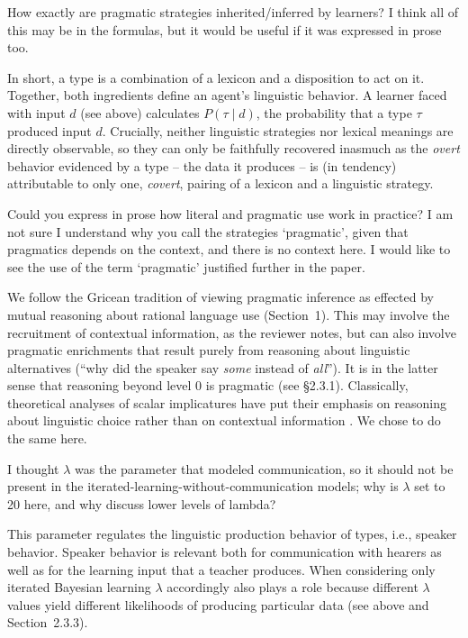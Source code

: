\documentclass[12pt,a4paper]{article}
\begin{document}
\vspace{.5cm}
\begin{mdframed}[backgroundcolor=gray!25,linecolor=gray!25]
How exactly are pragmatic strategies inherited/inferred by learners?    I think all of this may be in the formulas, but it would be useful if it was expressed in prose too.
\end{mdframed}
In short, a type is a combination of a lexicon and a disposition to act on it. Together, both ingredients define an agent's linguistic behavior. A learner faced with input $d$ (see above) calculates $P(\tau \mid d)$, the probability that a type $\tau$ produced input $d$. Crucially, neither linguistic strategies nor lexical meanings are directly observable, so they can only be faithfully recovered inasmuch as the {\em overt} behavior evidenced by a type -- the data it produces -- is (in tendency) attributable to only one, {\em covert}, pairing of a lexicon and a linguistic strategy.

\vspace{.5cm}
\begin{mdframed}[backgroundcolor=gray!25,linecolor=gray!25]
Could you express in prose how literal and pragmatic use work in practice? I am not sure I understand why you call the strategies `pragmatic', given that pragmatics depends on the context, and there is no context here. I would like to see the use of the term `pragmatic' justified further in the paper.
\end{mdframed}
We follow the Gricean tradition of viewing pragmatic inference as effected by mutual reasoning about rational language use (Section~1). This may involve the recruitment of contextual information, as the reviewer notes, but can also involve pragmatic enrichments that result purely from reasoning about linguistic alternatives (``why did the speaker say {\em some} instead of {\em all}''). It is in the latter sense that reasoning beyond level $0$ is pragmatic (see \S2.3.1). Classically, theoretical analyses of scalar implicatures have put their emphasis on reasoning about linguistic choice rather than on contextual information \citep[e.g.,][]{horn:1972,gazdar:1979, franke:2009, GoodmanStuhlmuller2013:Knowledge-and-I}. We chose to do the same here.

\vspace{.5cm}
\begin{mdframed}[backgroundcolor=gray!25,linecolor=gray!25]
I thought $\lambda$ was the parameter that modeled communication, so it should not be present in the iterated-learning-without-communication models; why is $\lambda$ set to 20 here, and why discuss lower levels of lambda? 
\end{mdframed}
This parameter regulates the linguistic production behavior of types, i.e., speaker behavior. Speaker behavior is relevant both for communication with hearers as well as for the learning input that a teacher produces. When considering only iterated Bayesian learning $\lambda$ accordingly also plays a role because different $\lambda$ values yield different likelihoods of producing particular data (see above and Section~2.3.3). 
\end{document}
